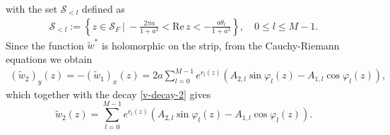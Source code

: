 \documentclass[11pt, letterpaper, reqno]{amsart}
\numberwithin{equation}{section}
\theoremstyle{definition}
\theoremstyle{plain}
\numberwithin{equation}{section}
\def\SS{\mathcal{S}}
\begin{document}
with the set $\SS_{<l}$ defined as
\begin{align*}
\SS_{<l} := \left\{z\in\SS_{F} \ | \ -\frac{2\pi a}{1+a^2} < \mathrm{Re}\,z < -\frac{a\theta_{l}}{1+a^{2}}\right\}, \quad 0\le l \le M-1.
\end{align*} 
Since the function $\tilde w^{*}$ is holomorphic on the strip, from the Cauchy-Riemann equations we obtain
\begin{equation*}
\begin{aligned}
(\tilde{w}_{2})_y(z) = -(\tilde{w}_{1})_x(z) = 2a\sum_{l=0}^{M-1} e^{r_{l}(z)}(A_{2,l}\sin\varphi_{l}(z) - A_{1,l}\cos\varphi_{l}(z)),
\end{aligned}
\end{equation*}
which together with the decay \eqref{v-decay-2} gives
\begin{equation}\label{w2}
\tilde{w}_{2}(z) = \sum_{l=0}^{M-1} e^{r_{l}(z)}(A_{2,l}\sin\varphi_{l}(z) - A_{1,l}\cos\varphi_{l}(z)).
\end{equation}
\end{document}
